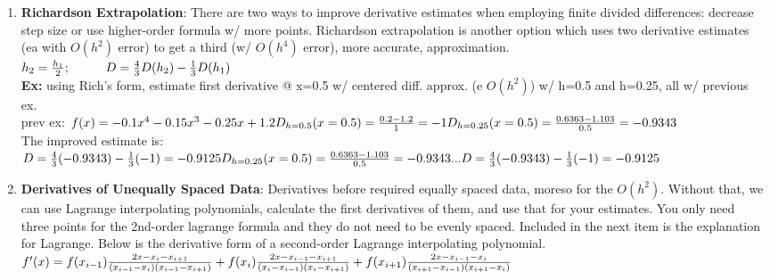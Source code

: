 \documentclass[fontsize=5pt]{scrartcl}
\begin{document}
\begin{multicols}{3}
\begin{enumerate}
        \item \textbf{Richardson Extrapolation}: There are two ways to improve derivative estimates when employing 
          finite divided differences: decrease step size or use higher-order formula w/ more points. Richardson 
          extrapolation is another option which uses two derivative estimates (ea with $O(h^2)$ error) to get a third
          (w/ $O(h^4)$ error), more accurate, approximation. \\
          \begin{math}
            h_2=\frac{h_1}{2};\hspace{10mm} D=\frac{4}{3}D(h_2)-\frac{1}{3}D(h_1)\\
          \end{math}\\
          \textbf{Ex:} using Rich's form, estimate first derivative @ x=0.5 w/ centered diff. approx. (e $O(h^2)$)
          w/ h=0.5 and h=0.25, all w/ previous ex.\\
          prev ex:
          \begin{math}
             f(x)=-0.1x^4-0.15x^3-0.25x+1.2\\
            D_{h=0.5}(x=0.5)=\frac{0.2-1.2}{1}=-1\\
            D_{h=0.25}(x=0.5)=\frac{0.6363-1.103}{0.5}=-0.9343\\
          \end{math}\\
            The improved estimate is:\\
          \begin{math}
            D=\frac{4}{3}(-0.9343)-\frac{1}{3}(-1) = -0.9125\\ 
            D_{h=0.25}(x=0.5)=\frac{0.6363-1.103}{0.5}=-0.9343\\
            ...\\
            D=\frac{4}{3}(-0.9343)-\frac{1}{3}(-1)=-0.9125\\
          \end{math}
          
          \item \textbf{Derivatives of Unequally Spaced Data}: Derivatives before required equally spaced data,
            moreso for the $O(h^2)$. Without that, we can use Lagrange interpolating polynomials, calculate the 
            first derivatives of them, and use that for your estimates. You only need three points for the 2nd-order
            lagrange formula and they do not need to be evenly spaced. Included in the next item is the explanation
            for Lagrange. Below is the derivative form of a second-order Lagrange interpolating polynomial.\\
            \begin{math}
              f'(x)=f(x_{i-1})\frac{2x-x_i-x_{i+1}}{(x_{i-1}-x_i)(x_{i-1}-x_{i+1})} +\\
              f(x_i)\frac{2x-x_{i-1}-x_{i+1}}{(x_i-x_{i-1})(x_i-x_{i+1})} + \\
              f(x_{i+1})\frac{2x-x_{i-1}-x_i}{(x_{i+1}-x_{i-1})(x_{i+1}-x_i)}
            \end{math}


\end{enumerate}
\end{multicols}
\end{document}
